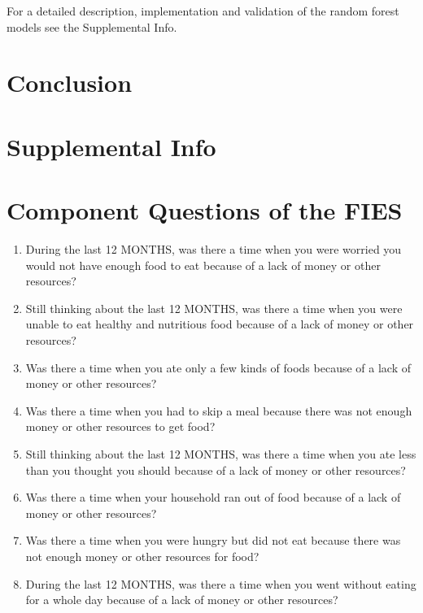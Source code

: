 \documentclass{article}
\begin{document}
For a detailed description, implementation and validation of the random forest models see the Supplemental Info.

\section{Conclusion}

\printbibliography

\section*{Supplemental Info}
\setcounter{table}{0}
\setcounter{figure}{0}
\setcounter{section}{0}
\renewcommand{\thetable}{S\arabic{table}}
\renewcommand{\thefigure}{S\arabic{figure}}
\renewcommand{\thesection}{S\arabic{section}}

\section{Component Questions of the FIES}
\begin{enumerate}
	\item During the last 12 MONTHS, was there a time when you were worried you would not have enough food to eat because of a lack of money or other resources?
	\item Still thinking about the last 12 MONTHS, was there a time when you were unable to eat healthy and nutritious food because of a lack of money or other resources?
	\item Was there a time when you ate only a few kinds of foods because of a lack of money or other resources?
	\item Was there a time when you had to skip a meal because there was not enough money or other resources to get food?
	\item Still thinking about the last 12 MONTHS, was there a time when you ate less than you thought you should because of a lack of money or other resources?
	\item Was there a time when your household ran out of food because of a lack of money or other resources?
	\item Was there a time when you were hungry but did not eat because there was not enough money or other resources for food?
	\item During the last 12 MONTHS, was there a time when you went without eating for a whole day because of a lack of money or other resources?
\end{enumerate}
\end{document}
